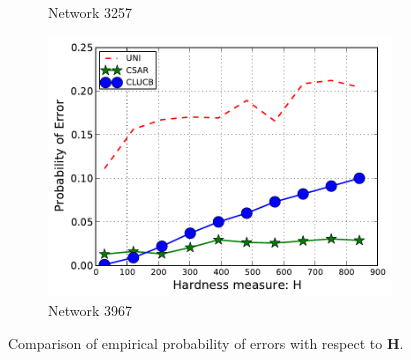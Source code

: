\documentclass{article}
\begin{document}
\begin{figure}[ht]
\begin{subfigure}[c]{\imgsize\textwidth}
	\caption{Network 3257}
\end{subfigure}
\begin{subfigure}[c]{\imgsize\textwidth}
	\includegraphics[width=\textwidth]{fig/exp/mst-c-3967}
	\caption{Network 3967}
\end{subfigure}
\caption{Comparison of empirical probability of errors  with respect to $\mathbf H$.}
\label{fig:exp1}
\end{figure}
\end{document}

